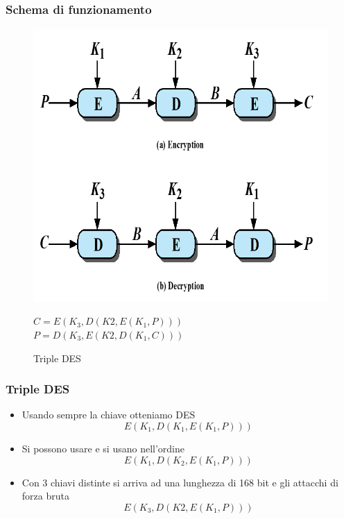 		\begin{frame}
			\frametitle{Schema di funzionamento}		
			\begin{center}
				\begin{figure}
					\includegraphics[scale=0.2]{img/tripleDes}
					\caption{Triple DES}
					$C=E(K_3,D(K2,E(K_1,P)))$\\
					$P=D(K_3,E(K2,D(K_1,C)))$
				\end{figure}
			\end{center}
		\end{frame}
	
		\begin{frame}
			\frametitle{Triple DES}		
			\begin{itemize}
				\item Usando sempre la  chiave otteniamo DES $$E(K_1,D(K_1,E(K_1,P)))$$
				\item Si possono usare  e si usano nell'ordine $$E(K_1,D(K_2,E(K_1,P)))$$
				\item Con 3 chiavi distinte si arriva ad una lunghezza di 168 bit e  gli attacchi di forza bruta $$E(K_3,D(K2,E(K_1,P)))$$
			\end{itemize}
		\end{frame}

